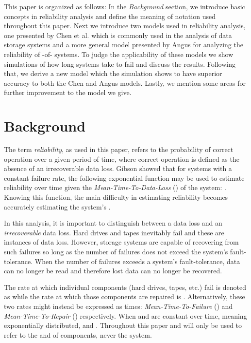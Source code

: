 \documentclass[XXX,endnotes]{usetex-v1}
\begin{document}
This paper is organized as follows:  In the \emph{Background} section, we introduce basic concepts in reliability analysis and define the meaning of notation used throughout this paper.  Next we introduce two models used in reliability analysis, one presented by Chen et al. which is commonly used in the analysis of data storage systems and a more general model presented by Angus for analyzing the reliability of -of- systems.  To judge the applicability of these models we show simulations of how long systems take to fail and discuss the results.  Following that, we derive a new model which the simulation shows to have superior accuracy to both the Chen and Angus models.  Lastly, we mention some areas for further improvement to the model we give.

\section{Background}

The term \emph{reliability}, as used in this paper, refers to the probability of correct operation over a given period of time, where correct operation is defined as the absence of an irrecoverable data loss.  Gibson\cite{gibson} showed that for systems with a constant failure rate, the following exponential function may be used to estimate reliability over time  given the \emph{Mean-Time-To-Data-Loss} () of the system: .  Knowing this function, the main difficulty in estimating reliability becomes accurately estimating the system's . 

In this analysis, it is important to distinguish between a data loss and an \emph{irrecoverable} data loss.  Hard drives and tapes inevitably fail and these are instances of data loss.  However, storage systems are capable of recovering from such failures so long as the number of failures does not exceed the system's fault-tolerance.  When the number of failures exceeds a system's fault-tolerance, data can no longer be read and therefore lost data can no longer be recovered.

The rate at which individual components (hard drives, tapes, etc.) fail is denoted as  while the rate at which those components are repaired is .  Alternatively, these two rates might instead be expressed as times: \emph{Mean-Time-To-Failure} () and \emph{Mean-Time-To-Repair} () respectively.  When  and  are constant over time, meaning exponentially distributed,  and .  Throughout this paper  and  will only be used to refer to the  and  of components, never the system.
\end{document}
